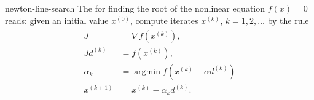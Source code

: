 \begin{Definition}{newton-line-search}
  The  for
  finding the root of the nonlinear equation $f(x) = 0$ reads: given
  an initial value $x^{(0)}$, compute iterates $x^{(k)}$,
  $k=1,2,\ldots$ by the rule
  \begin{gather}
    \label{eq:newton-line-search:1}
    \begin{split}
      J &= \nabla f\left(x^{(k)}\right),
      \\
       J d^{(k)} &= f(x^{(k)}),
      \\
      \alpha_k &= \operatorname*{argmin} f(x^{(k)} - \alpha d^{(k)})\\
      x^{(k+1)} &= x^{(k)} - \alpha_k d^{(k)}.
    \end{split}
  \end{gather}
\end{Definition}

